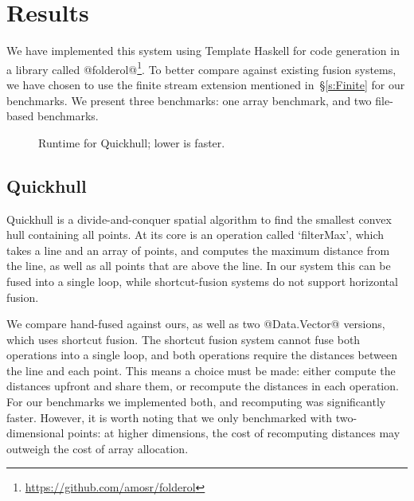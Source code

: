 
\section{Results}
\label{s:Benchmarks}

We have implemented this system using Template Haskell for code generation in a library called @folderol@\footnote{\url{https://github.com/amosr/folderol}}.
To better compare against existing fusion systems, we have chosen to use the finite stream extension mentioned in~\S\ref{s:Finite} for our benchmarks.
We present three benchmarks: one array benchmark, and two file-based benchmarks.

\begin{figure}
\caption{Runtime for Quickhull; lower is faster.}
\label{fig:bench:quickhull}
\end{figure}

\subsection{Quickhull}
Quickhull is a divide-and-conquer spatial algorithm to find the smallest convex hull containing all points.
At its core is an operation called `filterMax', which takes a line and an array of points, and computes the maximum distance from the line, as well as all points that are above the line.
In our system this can be fused into a single loop, while shortcut-fusion systems do not support horizontal fusion.

We compare hand-fused against ours, as well as two @Data.Vector@ versions, which uses shortcut fusion.
The shortcut fusion system cannot fuse both operations into a single loop, and both operations require the distances between the line and each point.
This means a choice must be made: either compute the distances upfront and share them, or recompute the distances in each operation.
For our benchmarks we implemented both, and recomputing was significantly faster.
However, it is worth noting that we only benchmarked with two-dimensional points: at higher dimensions, the cost of recomputing distances may outweigh the cost of array allocation.

